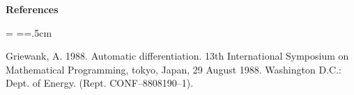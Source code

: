 %
%
%
\bigbreak
\centerline{\bf References}
\bigskip

{

\rmsmall\parindent=0cm \parskip=\medskipamount
\everypar={\hangindent=.5cm }

\par
Griewank, A. 1988. Automatic differentiation. 
   13th International Symposium on Mathematical Programming,
   tokyo, Japan, 29 August 1988. Washington D.C.: Dept. of Energy.
   (Rept. CONF--8808190--1).
}
\vfill\eject
